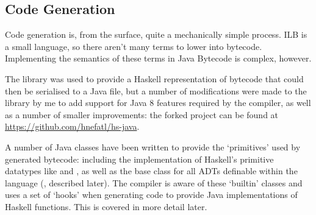 \documentclass[dissertation.tex]{subfiles}
\begin{document}
{{{\begin{itemize}
{            }
            \end{itemize}

        }
    }
    \subsection{Code Generation}
    {
        
        Code generation is, from the surface, quite a mechanically simple process. ILB is a small language, so there
        aren't many terms to lower into bytecode. Implementing the semantics of these terms in Java Bytecode is complex,
        however.

        The  library was used to provide a Haskell representation of bytecode that could then be
        serialised to a Java  file, but a number of modifications were made to the library by me to
        add support for Java 8 features required by the compiler, as well as a number of smaller improvements: the
        forked project can be found at \url{https://github.com/hnefatl/hs-java}.

        A number of Java classes have been written to provide the `primitives' used by generated bytecode: including the
        implementation of Haskell's primitive datatypes like  and , as well as the base class
        for all ADTs definable within the language (, described later). The compiler is aware of
        these `builtin' classes and uses a set of `hooks' when generating code to provide Java implementations of
        Haskell functions. This is covered in more detail later.


}}
\end{document}
